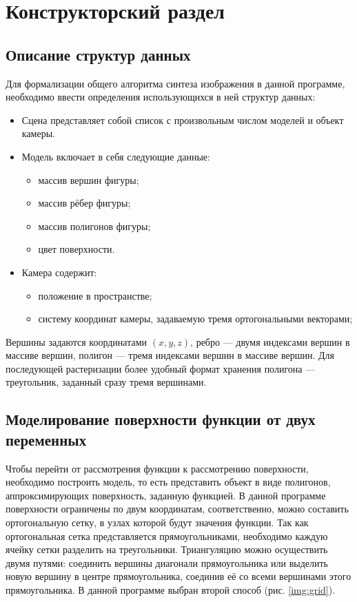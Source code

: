 \chapter{Конструкторский раздел}

\section{Описание структур данных}

Для формализации общего алгоритма синтеза изображения в данной программе, необходимо ввести определения использующихся в ней структур данных:
\begin{itemize}
	\item Сцена представляет собой список с произвольным числом моделей и объект камеры.
	\item Модель включает в себя следующие данные: \begin{itemize}
		\item массив вершин фигуры;
		\item массив рёбер фигуры;
		\item массив полигонов фигуры;
		\item цвет поверхности.
	\end{itemize}
	\item Камера содержит: \begin{itemize}
		\item положение в пространстве;
		\item систему координат камеры, задаваемую тремя ортогональными векторами;
	\end{itemize}
\end{itemize}

Вершины задаются координатами $(x, y, z)$, ребро — двумя индексами вершин в массиве вершин, полигон — тремя индексами вершин в массиве вершин.
Для последующей растеризации более удобный формат хранения полигона — треугольник, заданный сразу тремя вершинами.

\section{Моделирование поверхности функции от двух переменных}

Чтобы перейти от рассмотрения функции к рассмотрению поверхности, необходимо построить модель, то есть представить объект в виде полигонов, аппроксимирующих поверхность, заданную функцией.
В данной программе поверхности ограничены по двум координатам, соответственно, можно составить ортогональную сетку, в узлах которой будут значения функции.
Так как ортогональная сетка представляется прямоугольниками, необходимо каждую ячейку сетки разделить на треугольники.
Триангуляцию можно осуществить двумя путями: соединить вершины диагонали прямоугольника или выделить новую вершину в центре прямоугольника, соединив её со всеми вершинами этого прямоугольника.
В данной программе выбран второй способ (рис. \ref{img:grid}).

